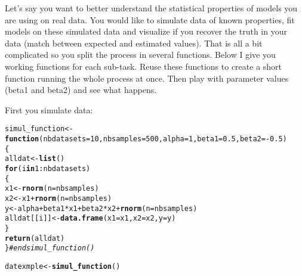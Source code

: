 \documentclass[12pt,a4paper]{scrartcl}\usepackage[]{graphicx}\usepackage[]{color}
\makeatletter
\newcommand{\hlnum}[1]{\textcolor[rgb]{0.686,0.059,0.569}{#1}}%
\newcommand{\hlcom}[1]{\textcolor[rgb]{0.678,0.584,0.686}{\textit{#1}}}%
\newcommand{\hlopt}[1]{\textcolor[rgb]{0,0,0}{#1}}%
\newcommand{\hlstd}[1]{\textcolor[rgb]{0.345,0.345,0.345}{#1}}%
\newcommand{\hlkwa}[1]{\textcolor[rgb]{0.161,0.373,0.58}{\textbf{#1}}}%
\newcommand{\hlkwb}[1]{\textcolor[rgb]{0.69,0.353,0.396}{#1}}%
\newcommand{\hlkwc}[1]{\textcolor[rgb]{0.333,0.667,0.333}{#1}}%
\newcommand{\hlkwd}[1]{\textcolor[rgb]{0.737,0.353,0.396}{\textbf{#1}}}%
\newenvironment{kframe}{%
 \def\at@end@of@kframe{}%
 \ifinner\ifhmode%
  \def\at@end@of@kframe{\end{minipage}}%
  \begin{minipage}{\columnwidth}%
 \fi\fi%
 \def\FrameCommand##1{\hskip\@totalleftmargin \hskip-\fboxsep
 \colorbox{shadecolor}{##1}\hskip-\fboxsep
     \hskip-\linewidth \hskip-\@totalleftmargin \hskip\columnwidth}%
 \MakeFramed {\advance\hsize-\width
   \@totalleftmargin\z@ \linewidth\hsize
   \@setminipage}}%
 {\par\unskip\endMakeFramed%
 \at@end@of@kframe}
\newenvironment{knitrout}{}{} %
\makeatother
\begin{document}
\begin{Exercise}[difficulty=2, title={Combine several functions together}]

Let's say you want to better understand the statistical properties of models you are using on real data. You would like to simulate data of known properties, fit models on these simulated data and visualize if you recover the truth in your data (match between expected and estimated values). That is all a bit complicated so you split the process in several functions. 
Below I give you working functions for each sub-task. Reuse these functions to create a short function running the whole process at once. Then play with parameter values (beta1 and beta2) and see what happens.

First you simulate data:
\begin{knitrout}
\color{fgcolor}\begin{kframe}
\begin{alltt}
\hlstd{simul_function} \hlkwb{<-} \hlkwa{function}\hlstd{(}\hlkwc{nbdatasets} \hlstd{=} \hlnum{10}\hlstd{,} \hlkwc{nbsamples}\hlstd{=} \hlnum{500}\hlstd{,} \hlkwc{alpha}\hlstd{=}\hlnum{1}\hlstd{,} \hlkwc{beta1}\hlstd{=}\hlnum{0.5}\hlstd{,} \hlkwc{beta2}\hlstd{=}\hlopt{-}\hlnum{0.5}\hlstd{)}
\hlstd{\{}
  \hlstd{alldat} \hlkwb{<-} \hlkwd{list}\hlstd{()}
  \hlkwa{for} \hlstd{(i} \hlkwa{in} \hlnum{1}\hlopt{:}\hlstd{nbdatasets)}
  \hlstd{\{}
    \hlstd{x1} \hlkwb{<-} \hlkwd{rnorm}\hlstd{(}\hlkwc{n} \hlstd{= nbsamples)}
    \hlstd{x2} \hlkwb{<-} \hlstd{x1} \hlopt{+} \hlkwd{rnorm}\hlstd{(}\hlkwc{n} \hlstd{= nbsamples)}
    \hlstd{y} \hlkwb{<-} \hlstd{alpha} \hlopt{+} \hlstd{beta1}\hlopt{*}\hlstd{x1} \hlopt{+} \hlstd{beta2}\hlopt{*}\hlstd{x2} \hlopt{+} \hlkwd{rnorm}\hlstd{(}\hlkwc{n} \hlstd{= nbsamples)}
    \hlstd{alldat[[i]]} \hlkwb{<-} \hlkwd{data.frame}\hlstd{(}\hlkwc{x1}\hlstd{=x1,} \hlkwc{x2}\hlstd{=x2,} \hlkwc{y}\hlstd{=y)}
  \hlstd{\}}
  \hlkwd{return}\hlstd{(alldat)}
\hlstd{\}}\hlcom{#end simul_function()}

\hlstd{datexmple} \hlkwb{<-} \hlkwd{simul_function}\hlstd{()}
\end{alltt}
\end{kframe}
\end{knitrout}


\end{Exercise}
\end{document}
